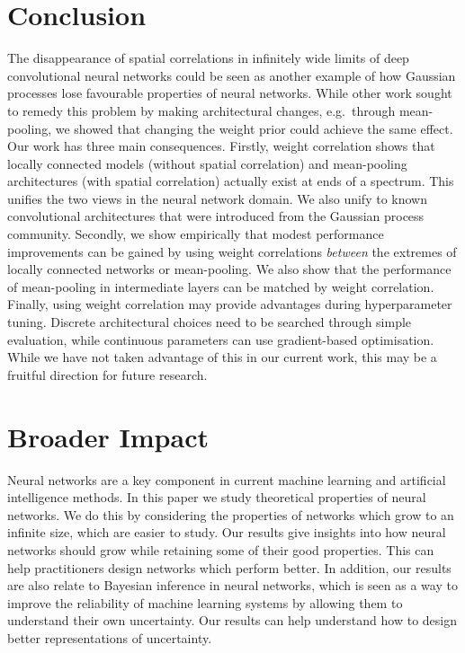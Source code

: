 \documentclass{article}
\theoremstyle{definition}
\begin{document}
\section{Conclusion}
\vspace{-0.3cm}
The disappearance of spatial correlations in infinitely wide limits of deep convolutional neural networks could be seen as another example of how Gaussian processes lose favourable properties of neural networks. While other work sought to remedy this problem by making architectural changes, e.g.~through mean-pooling, we showed that changing the weight prior could achieve the same effect. Our work has three main consequences.
Firstly, weight correlation shows that locally connected models (without spatial correlation) and mean-pooling architectures (with spatial correlation) actually exist at ends of a spectrum. This unifies the two views in the neural network domain. We also unify to known convolutional architectures that were introduced from the Gaussian process community.
Secondly, we show empirically that modest performance improvements can be gained by using weight correlations \emph{between} the extremes of locally connected networks or mean-pooling. We also show that the performance of mean-pooling in intermediate layers can be matched by weight correlation.
Finally, using weight correlation may provide advantages during hyperparameter tuning. Discrete architectural choices need to be searched through simple evaluation, while continuous parameters can use gradient-based optimisation. While we have not taken advantage of this in our current work, this may be a fruitful direction for future research.






\section*{Broader Impact}
Neural networks are a key component in current machine learning and artificial intelligence methods. In this paper we study theoretical properties of neural networks. We do this by considering the properties of networks which grow to an infinite size, which are easier to study. Our results give insights into how neural networks should grow while retaining some of their good properties. This can help practitioners design networks which perform better. In addition, our results are also relate to Bayesian inference in neural networks, which is seen as a way to improve the reliability of machine learning systems by allowing them to understand their own uncertainty. Our results can help understand how to design better representations of uncertainty.
\end{document}

